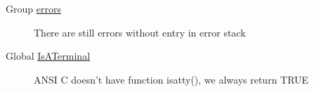 \label{bug__bug000001}
\hypertarget{bug__bug000001}{}
 \begin{description}
\item[Group \hyperlink{group__errors}{errors} ]There are still errors without entry in error stack

\end{description}


\label{bug__bug000002}
\hypertarget{bug__bug000002}{}
 \begin{description}
\item[Global \hyperlink{group__utilities_g9a90e738d03b642f33901600671d225a}{IsATerminal} ]ANSI C doesn't have function isatty(), we always return TRUE

\end{description}
